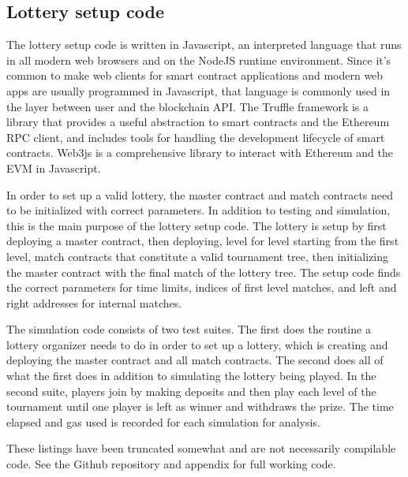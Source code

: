 \subsection{Lottery setup code}
The lottery setup code is written in Javascript, an interpreted language that runs in all modern web browsers and on the NodeJS runtime environment. Since it's common to make web clients for smart contract applications and modern web apps are usually programmed in Javascript, that language is commonly used in the layer between user and the blockchain API. The Truffle framework is a library that provides a useful abstraction to smart contracts and the Ethereum RPC client, and includes tools for handling the development lifecycle of smart contracts. Web3js is a comprehensive library to interact with Ethereum and the EVM in Javascript.

In order to set up a valid lottery, the master contract and match contracts need to be initialized with correct parameters. In addition to testing and simulation, this is the main purpose of the lottery setup code. The lottery is setup by first deploying a master contract, then deploying, level for level starting from the first level, match contracts that constitute a valid tournament tree, then initializing the master contract with the final match of the lottery tree. The setup code finds the correct parameters for time limits, indices of first level matches, and left and right addresses for internal matches. 

The simulation code consists of two test suites. The first does the routine a lottery organizer needs to do in order to set up a lottery, which is creating and deploying the master contract and all match contracts. The second does all of what the first does in addition to simulating the lottery being played. In the second suite, players join by making deposits and then play each level of the tournament until one player is left as winner and withdraws the prize.
The time elapsed and gas used is recorded for each simulation for analysis.

These listings have been truncated somewhat and are not necessarily compilable code. See the Github repository and appendix for full working code.




